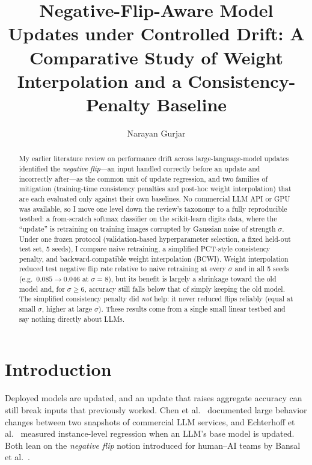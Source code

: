\documentclass[acmsmall,screen]{acmart}
\begin{document}
\title{Negative-Flip-Aware Model Updates under Controlled Drift: A Comparative Study of Weight Interpolation and a Consistency-Penalty Baseline}
\author{Narayan Gurjar}
\renewcommand{\shortauthors}{Gurjar}

\begin{abstract}
My earlier literature review on performance drift across large-language-model updates identified the \emph{negative flip}---an input handled correctly before an update and incorrectly after---as the common unit of update regression, and two families of mitigation (training-time consistency penalties and post-hoc weight interpolation) that are each evaluated only against their own baselines. No commercial LLM API or GPU was available, so I move one level down the review's taxonomy to a fully reproducible testbed: a from-scratch softmax classifier on the scikit-learn digits data, where the ``update'' is retraining on training images corrupted by Gaussian noise of strength $\sigma$. Under one frozen protocol (validation-based hyperparameter selection, a fixed held-out test set, 5 seeds), I compare naive retraining, a simplified PCT-style consistency penalty, and backward-compatible weight interpolation (BCWI). Weight interpolation reduced test negative flip rate relative to naive retraining at every $\sigma$ and in all 5 seeds (e.g.\ $0.085\to0.046$ at $\sigma{=}8$), but its benefit is largely a shrinkage toward the old model and, for $\sigma\ge 6$, accuracy still falls below that of simply keeping the old model. The simplified consistency penalty did \emph{not} help: it never reduced flips reliably (equal at small $\sigma$, higher at large $\sigma$). These results come from a single small linear testbed and say nothing directly about LLMs.
\end{abstract}
\maketitle

\section{Introduction}
Deployed models are updated, and an update that raises aggregate accuracy can still break inputs that previously worked. Chen et al.~\cite{chen2024chatgpt} documented large behavior changes between two snapshots of commercial LLM services, and Echterhoff et al.~\cite{echterhoff2024muscle} measured instance-level regression when an LLM's base model is updated. Both lean on the \emph{negative flip} notion introduced for human--AI teams by Bansal et al.~\cite{bansal2019updates}.
\end{document}
